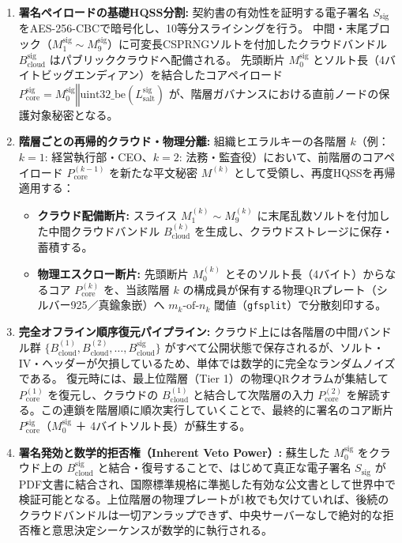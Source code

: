 \documentclass[11pt,a4paper,titlepage]{article}
\begin{document}
\begin{enumerate}
  \item \textbf{署名ペイロードの基礎HQSS分割:}
    契約書の有効性を証明する電子署名 $S_{\text{sig}}$ をAES-256-CBCで暗号化し、10等分スライシングを行う。
    中間・末尾ブロック（$M_1^{\text{sig}} \sim M_9^{\text{sig}}$）に可変長CSPRNGソルトを付加したクラウドバンドル $B_{\text{cloud}}^{\text{sig}}$ はパブリッククラウドへ配備される。
    先頭断片 $M_0^{\text{sig}}$ とソルト長（4バイトビッグエンディアン）を結合したコアペイロード $P_{\text{core}}^{\text{sig}} = M_0^{\text{sig}} \mathbin{\Vert} \text{uint32\_be}(L_{\text{salt}}^{\text{sig}})$ が、階層ガバナンスにおける直前ノードの保護対象秘密となる。
  \item \textbf{階層ごとの再帰的クラウド・物理分離:}
    組織ヒエラルキーの各階層 $k$（例：$k=1$: 経営執行部・CEO、$k=2$: 法務・監査役）において、前階層のコアペイロード $P_{\text{core}}^{(k-1)}$ を新たな平文秘密 $M^{(k)}$ として受領し、再度HQSSを再帰適用する：
    \begin{itemize}
      \item \textbf{クラウド配備断片:} スライス $M_1^{(k)} \sim M_9^{(k)}$ に末尾乱数ソルトを付加した中間クラウドバンドル $B_{\text{cloud}}^{(k)}$ を生成し、クラウドストレージに保存・蓄積する。
      \item \textbf{物理エスクロー断片:} 先頭断片 $M_0^{(k)}$ とそのソルト長（4バイト）からなるコア $P_{\text{core}}^{(k)}$ を、当該階層 $k$ の構成員が保有する物理QRプレート（シルバー925／真鍮象嵌）へ $m_k\text{-of-}n_k$ 閾値（\texttt{gfsplit}）で分散刻印する。
    \end{itemize}
  \item \textbf{完全オフライン順序復元パイプライン:}
    クラウド上には各階層の中間バンドル群 $\{B_{\text{cloud}}^{(1)}, B_{\text{cloud}}^{(2)}, \dots, B_{\text{cloud}}^{\text{sig}}\}$ がすべて公開状態で保存されるが、ソルト・IV・ヘッダーが欠損しているため、単体では数学的に完全なランダムノイズである。
    復元時には、最上位階層（Tier 1）の物理QRクオラムが集結して $P_{\text{core}}^{(1)}$ を復元し、クラウドの $B_{\text{cloud}}^{(1)}$ と結合して次階層の入力 $P_{\text{core}}^{(2)}$ を解読する。この連鎖を階層順に順次実行していくことで、最終的に署名のコア断片 $P_{\text{core}}^{\text{sig}}$（$M_0^{\text{sig}}$ ＋ 4バイトソルト長）が蘇生する。
  \item \textbf{署名発効と数学的拒否権（Inherent Veto Power）:}
    蘇生した $M_0^{\text{sig}}$ をクラウド上の $B_{\text{cloud}}^{\text{sig}}$ と結合・復号することで、はじめて真正な電子署名 $S_{\text{sig}}$ がPDF文書に結合され、国際標準規格に準拠した有効な公文書として世界中で検証可能となる。上位階層の物理プレートが1枚でも欠けていれば、後続のクラウドバンドルは一切アンラップできず、中央サーバーなしで絶対的な拒否権と意思決定シーケンスが数学的に執行される。
\end{enumerate}
\end{document}
